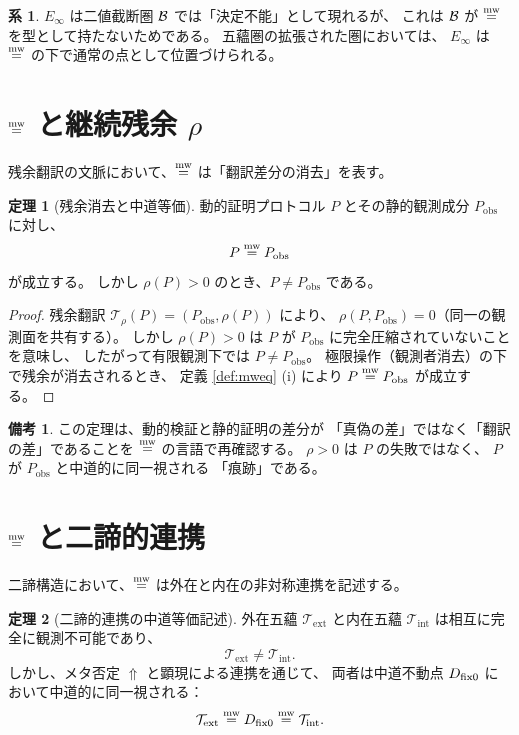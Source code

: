 \documentclass[11pt,a4paper]{article}
\theoremstyle{definition}
\newtheorem{theorem}{定理}[section]
\newtheorem{corollary}{系}[section]
\newtheorem{remark}{備考}[section]
\newcommand{\T}{\mathcal{T}}
\newcommand{\TExt}{\T_{\mathrm{ext}}}
\newcommand{\TInt}{\T_{\mathrm{int}}}
\newcommand{\Einfty}{E_{\infty}}
\begin{document}
\begin{corollary}
$\Einfty$ は二値截断圏 $\mathcal{B}$ では「決定不能」として現れるが、
これは $\mathcal{B}$ が $\mathrel{\overset{\mathrm{mw}}{=}}$ を型として持たないためである。
五蘊圏の拡張された圏においては、
$\Einfty$ は $\mathrel{\overset{\mathrm{mw}}{=}}$ の下で通常の点として位置づけられる。
\end{corollary}

\section{\texorpdfstring{$\mathrel{\overset{\mathrm{mw}}{=}}$}{mw-equivalence} と継続残余 \texorpdfstring{$\rho$}{rho}}

残余翻訳の文脈において、$\mathrel{\overset{\mathrm{mw}}{=}}$ は「翻訳差分の消去」を表す。

\begin{theorem}[残余消去と中道等価]\label{thm:rho-mweq}
動的証明プロトコル $P$ とその静的観測成分 $P_{\mathrm{obs}}$ に対し、
\[
P \mathrel{\overset{\mathrm{mw}}{=}} P_{\mathrm{obs}}
\]
が成立する。
しかし $\rho(P)>0$ のとき、$P\neq P_{\mathrm{obs}}$ である。
\end{theorem}

\begin{proof}
残余翻訳 $\mathcal{T}_\rho(P)=(P_{\mathrm{obs}},\rho(P))$ により、
$\rho(P,P_{\mathrm{obs}})=0$（同一の観測面を共有する）。
しかし $\rho(P)>0$ は $P$ が $P_{\mathrm{obs}}$ に完全圧縮されていないことを意味し、
したがって有限観測下では $P\neq P_{\mathrm{obs}}$。
極限操作（観測者消去）の下で残余が消去されるとき、
定義 \ref{def:mweq} (i) により $P\mathrel{\overset{\mathrm{mw}}{=}} P_{\mathrm{obs}}$ が成立する。
\end{proof}

\begin{remark}
この定理は、動的検証と静的証明の差分が
「真偽の差」ではなく「翻訳の差」であることを
$\mathrel{\overset{\mathrm{mw}}{=}}$ の言語で再確認する。
$\rho>0$ は $P$ の失敗ではなく、
$P$ が $P_{\mathrm{obs}}$ と中道的に同一視される
「痕跡」である。
\end{remark}

\section{\texorpdfstring{$\mathrel{\overset{\mathrm{mw}}{=}}$}{mw-equivalence} と二諦的連携}

二諦構造において、$\mathrel{\overset{\mathrm{mw}}{=}}$ は外在と内在の非対称連携を記述する。

\begin{theorem}[二諦的連携の中道等価記述]\label{thm:twotruths-mweq}
外在五蘊 $\TExt$ と内在五蘊 $\TInt$ は相互に完全に観測不可能であり、
\[
\TExt \neq \TInt.
\]
しかし、メタ否定 $\Uparrow$ と顕現による連携を通じて、
両者は中道不動点 $D_{\mathrm{fix}0}$ において中道的に同一視される：
\[
\TExt \mweq \dfix \mweq \TInt.
\]
\end{theorem}
\end{document}

